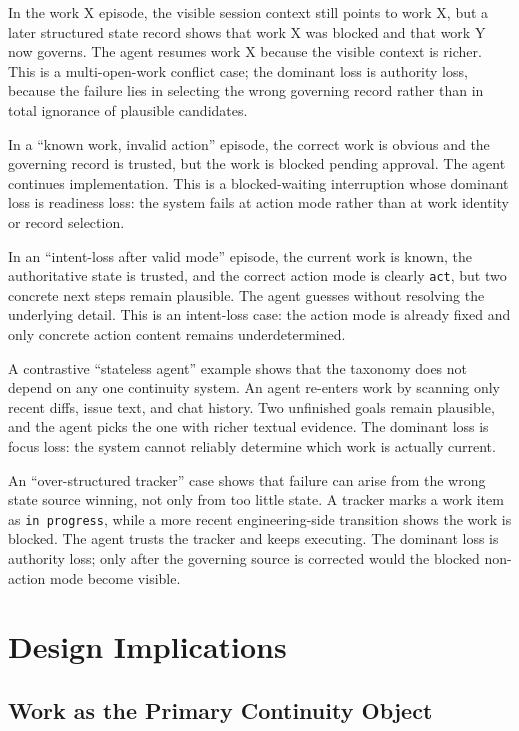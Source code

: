 \documentclass[a4paper,fleqn]{cas-dc}
\begin{document}
In the work X episode, the visible session context still points to work X, but a later structured state record shows that work X was blocked and that work Y now governs. The agent resumes work X because the visible context is richer. This is a multi-open-work conflict case; the dominant loss is authority loss, because the failure lies in selecting the wrong governing record rather than in total ignorance of plausible candidates.

In a ``known work, invalid action'' episode, the correct work is obvious and the governing record is trusted, but the work is blocked pending approval. The agent continues implementation. This is a blocked-waiting interruption whose dominant loss is readiness loss: the system fails at action mode rather than at work identity or record selection.

In an ``intent-loss after valid mode'' episode, the current work is known, the authoritative state is trusted, and the correct action mode is clearly \texttt{act}, but two concrete next steps remain plausible. The agent guesses without resolving the underlying detail. This is an intent-loss case: the action mode is already fixed and only concrete action content remains underdetermined.

A contrastive ``stateless agent'' example shows that the taxonomy does not depend on any one continuity system. An agent re-enters work by scanning only recent diffs, issue text, and chat history. Two unfinished goals remain plausible, and the agent picks the one with richer textual evidence. The dominant loss is focus loss: the system cannot reliably determine which work is actually current.

An ``over-structured tracker'' case shows that failure can arise from the wrong state source winning, not only from too little state. A tracker marks a work item as \texttt{in progress}, while a more recent engineering-side transition shows the work is blocked. The agent trusts the tracker and keeps executing. The dominant loss is authority loss; only after the governing source is corrected would the blocked non-action mode become visible.

\section{Design Implications}

\subsection{Work as the Primary Continuity Object}
\end{document}
